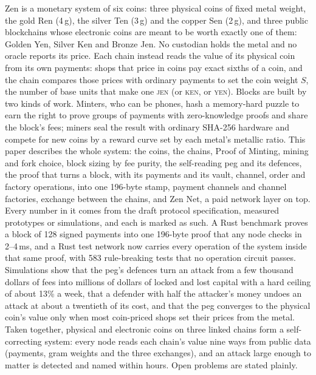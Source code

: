 \documentclass[11pt,a4paper]{article}
\newcommand{\JEN}{\textsc{jen}}
\newcommand{\KEN}{\textsc{ken}}
\newcommand{\YEN}{\textsc{yen}}
\begin{document}
\begin{titlepage}
\begin{keybox}[Abstract]
Zen is a monetary system of six coins: three physical coins of fixed metal weight, the gold Ren (4\,g), the silver Ten (3\,g) and the copper Sen (2\,g), and three public blockchains whose electronic coins are meant to be worth exactly one of them: Golden Yen, Silver Ken and Bronze Jen. No custodian holds the metal and no oracle reports its price. Each chain instead reads the value of its physical coin from its own payments: shops that price in coins pay exact sixths of a coin, and the chain compares those prices with ordinary payments to set the coin weight $S$, the number of base units that make one \JEN{} (or \KEN, or \YEN). Blocks are built by two kinds of work. Minters, who can be phones, hash a memory-hard puzzle to earn the right to prove groups of payments with zero-knowledge proofs and share the block's fees; miners seal the result with ordinary SHA-256 hardware and compete for new coins by a reward curve set by each metal's metallic ratio. This paper describes the whole system: the coins, the chains, Proof of Minting, mining and fork choice, block sizing by fee purity, the self-reading peg and its defences, the proof that turns a block, with its payments and its vault, channel, order and factory operations, into one 196-byte stamp, payment channels and channel factories, exchange between the chains, and Zen Net, a paid network layer on top. Every number in it comes from the draft protocol specification, measured prototypes or simulations, and each is marked as such. A Rust benchmark proves a block of 128 signed payments into one 196-byte proof that any node checks in 2--4\,ms, and a Rust test network now carries every operation of the system inside that same proof, with 583 rule-breaking tests that no operation circuit passes. Simulations show that the peg's defences turn an attack from a few thousand dollars of fees into millions of dollars of locked and lost capital with a hard ceiling of about 13\% a week, that a defender with half the attacker's money undoes an attack at about a twentieth of its cost, and that the peg converges to the physical coin's value only when most coin-priced shops set their prices from the metal. Taken together, physical and electronic coins on three linked chains form a self-correcting system: every node reads each chain's value nine ways from public data (payments, gram weights and the three exchanges), and an attack large enough to matter is detected and named within hours. Open problems are stated plainly.
\end{keybox}
\end{titlepage}
\end{document}
